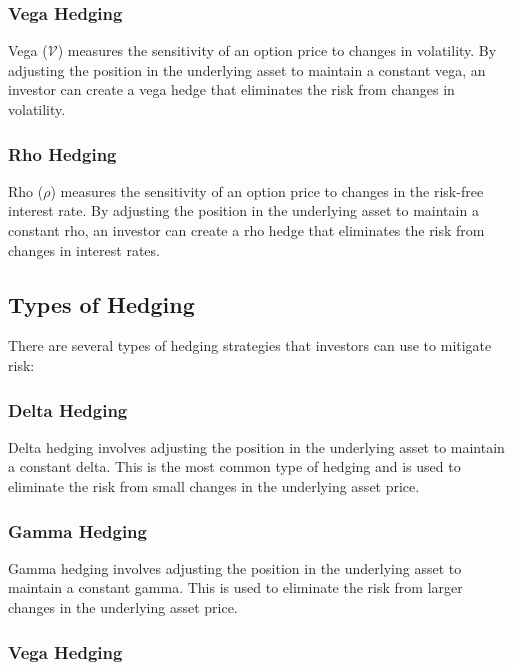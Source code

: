 \documentclass{article}
\theoremstyle{mytheoremstyle}
\theoremstyle{mytheoremstyle}
\theoremstyle{myproblemstyle}
\begin{document}
\subsubsection{Vega Hedging}

Vega ($\mathcal{V}$) measures the sensitivity of an option price to changes in volatility. By adjusting the position in the underlying asset to maintain a constant vega, an investor can create a vega hedge that eliminates the risk from changes in volatility.

\subsubsection{Rho Hedging}

Rho ($\rho$) measures the sensitivity of an option price to changes in the risk-free interest rate. By adjusting the position in the underlying asset to maintain a constant rho, an investor can create a rho hedge that eliminates the risk from changes in interest rates.

\subsection{Types of Hedging}

There are several types of hedging strategies that investors can use to mitigate risk:

\subsubsection{Delta Hedging}

Delta hedging involves adjusting the position in the underlying asset to maintain a constant delta. This is the most common type of hedging and is used to eliminate the risk from small changes in the underlying asset price.

\subsubsection{Gamma Hedging}

Gamma hedging involves adjusting the position in the underlying asset to maintain a constant gamma. This is used to eliminate the risk from larger changes in the underlying asset price.

\subsubsection{Vega Hedging}
\end{document}
